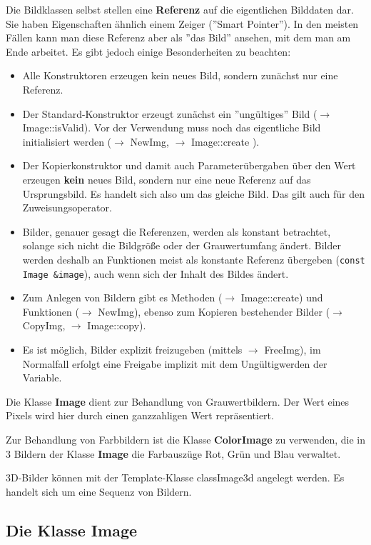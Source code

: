 \documentclass[10pt,titlepage]{article}
\def\see#1{$\to$ #1}
\def\bsee#1{#1}
\newcommand{\class}[1]{{\bf \bsee{#1}}}
\begin{document}
Die Bildklassen selbst stellen eine {\bf Referenz} auf die eigentlichen 
Bilddaten dar. Sie haben Eigenschaften ähnlich einem Zeiger (''Smart Pointer''). 
In den meisten Fällen kann man diese Referenz aber als ''das Bild'' ansehen, 
mit dem man am Ende arbeitet. Es gibt jedoch einige Besonderheiten zu beachten:
\begin{itemize}
\item Alle Konstruktoren erzeugen kein neues Bild, sondern zunächst nur eine 
Referenz. 
\item Der Standard-Konstruktor erzeugt zunächst ein ''ungültiges''
Bild (\see{Image::isValid}). Vor der Verwendung muss noch das 
eigentliche Bild initialisiert werden (\see{NewImg}, \see{Image::create} ).
\item Der Kopierkonstruktor und damit auch Parameterübergaben über den Wert 
erzeugen {\bf kein} neues Bild, sondern nur eine neue Referenz auf das 
Ursprungsbild. Es handelt sich also um das gleiche Bild. Das gilt auch für den 
Zuweisungsoperator.
\item Bilder, genauer gesagt die Referenzen,  werden als konstant 
betrachtet, solange sich nicht die Bildgröße oder der Grauwertumfang 
ändert. Bilder werden deshalb an Funktionen meist als konstante Referenz 
übergeben (\verb+const Image &image+), auch wenn sich der Inhalt des Bildes
ändert.
\item Zum Anlegen von Bildern gibt es Methoden (\see{Image::create}) 
und Funktionen (\see{NewImg}), ebenso zum Kopieren bestehender Bilder 
(\see{CopyImg}, \see{Image::copy}).
\item Es ist möglich, Bilder explizit freizugeben (mittels \see{FreeImg}), 
im Normalfall erfolgt eine Freigabe implizit mit dem Ungültigwerden 
der Variable. 
\end{itemize}

Die Klasse \class{Image} dient zur Behandlung von Grauwertbildern. Der 
Wert eines Pixels wird hier durch einen ganzzahligen Wert repräsentiert. 

Zur Behandlung von Farbbildern ist die Klasse \class{ColorImage}
zu verwenden, die in 3 Bildern der Klasse \class{Image} die Farbauszüge 
Rot, Grün und Blau verwaltet.

3D-Bilder können mit der Template-Klasse class{Image3d} angelegt werden.
Es handelt sich um eine Sequenz von Bildern.

\subsection{Die Klasse Image}
\label{Image}
\hypertarget{Image}{}
\end{document}
